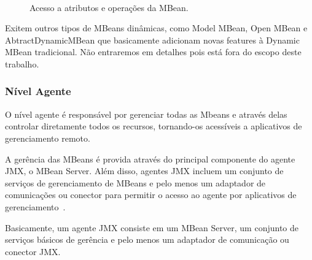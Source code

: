 \begin{figure}[htp]
\centering
{}
\\
\caption{Acesso a atributos e operações da MBean.}
\label{fig:requestjmx}
\end{figure}

Exitem outros tipos de MBeans dinâmicas, como Model MBean, Open MBean e AbtractDynamicMBean que basicamente adicionam novas features à Dynamic MBean tradicional. Não entraremos em detalhes pois está fora do escopo deste trabalho.

\subsubsection{Nível Agente}
O nível agente é responsável por gerenciar todas as Mbeans e através delas controlar diretamente todos os recursos, tornando-os acessíveis a aplicativos de gerenciamento remoto.

A gerência das MBeans é provida através do principal componente do agente JMX, o MBean Server. Além disso, agentes JMX incluem um conjunto de serviços de gerenciamento de MBeans e pelo menos um adaptador de comunicações ou conector para permitir o acesso ao agente por aplicativos de gerenciamento~\cite{jmx}.

Basicamente, um agente JMX consiste em um MBean Server, um conjunto de serviços básicos de gerência e pelo menos um adaptador de comunicação ou conector JMX.


